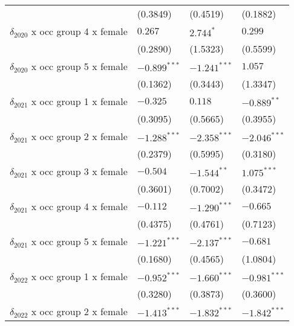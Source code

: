 \begin{tabular}{llll}
                                       &           (0.3849) &           (0.4519) &           (0.1882) \\
$\delta_{2020}$ x occ group 4 x female &            $0.267$ &          $2.744^*$ &            $0.299$ \\
                                       &           (0.2890) &           (1.5323) &           (0.5599) \\
$\delta_{2020}$ x occ group 5 x female &     $-0.899^{***}$ &     $-1.241^{***}$ &            $1.057$ \\
                                       &           (0.1362) &           (0.3443) &           (1.3347) \\
$\delta_{2021}$ x occ group 1 x female &           $-0.325$ &            $0.118$ &      $-0.889^{**}$ \\
                                       &           (0.3095) &           (0.5665) &           (0.3955) \\
$\delta_{2021}$ x occ group 2 x female &     $-1.288^{***}$ &     $-2.358^{***}$ &     $-2.046^{***}$ \\
                                       &           (0.2379) &           (0.5995) &           (0.3180) \\
$\delta_{2021}$ x occ group 3 x female &           $-0.504$ &      $-1.544^{**}$ &      $1.075^{***}$ \\
                                       &           (0.3601) &           (0.7002) &           (0.3472) \\
$\delta_{2021}$ x occ group 4 x female &           $-0.112$ &     $-1.290^{***}$ &           $-0.665$ \\
                                       &           (0.4375) &           (0.4761) &           (0.7123) \\
$\delta_{2021}$ x occ group 5 x female &     $-1.221^{***}$ &     $-2.137^{***}$ &           $-0.681$ \\
                                       &           (0.1680) &           (0.4565) &           (1.0804) \\
$\delta_{2022}$ x occ group 1 x female &     $-0.952^{***}$ &     $-1.660^{***}$ &     $-0.981^{***}$ \\
                                       &           (0.3280) &           (0.3873) &           (0.3600) \\
$\delta_{2022}$ x occ group 2 x female &     $-1.413^{***}$ &     $-1.832^{***}$ &     $-1.842^{***}$ \\

\end{tabular}
